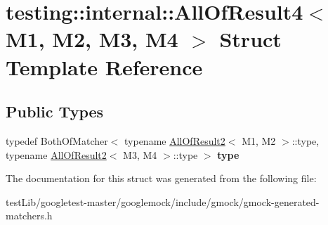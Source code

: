 \hypertarget{structtesting_1_1internal_1_1AllOfResult4}{}\section{testing\+:\+:internal\+:\+:All\+Of\+Result4$<$ M1, M2, M3, M4 $>$ Struct Template Reference}
\label{structtesting_1_1internal_1_1AllOfResult4}
\subsection*{Public Types}
\begin{DoxyCompactItemize}
\item 
\mbox{\label{structtesting_1_1internal_1_1AllOfResult4_ab277e20178bac632d4e5a39a1a407bbf}} 
typedef Both\+Of\+Matcher$<$ typename \hyperlink{structtesting_1_1internal_1_1AllOfResult2}{All\+Of\+Result2}$<$ M1, M2 $>$\+::type, typename \hyperlink{structtesting_1_1internal_1_1AllOfResult2}{All\+Of\+Result2}$<$ M3, M4 $>$\+::type $>$ {\bfseries type}
\end{DoxyCompactItemize}


The documentation for this struct was generated from the following file\+:\begin{DoxyCompactItemize}
\item 
test\+Lib/googletest-\/master/googlemock/include/gmock/gmock-\/generated-\/matchers.\+h\end{DoxyCompactItemize}
